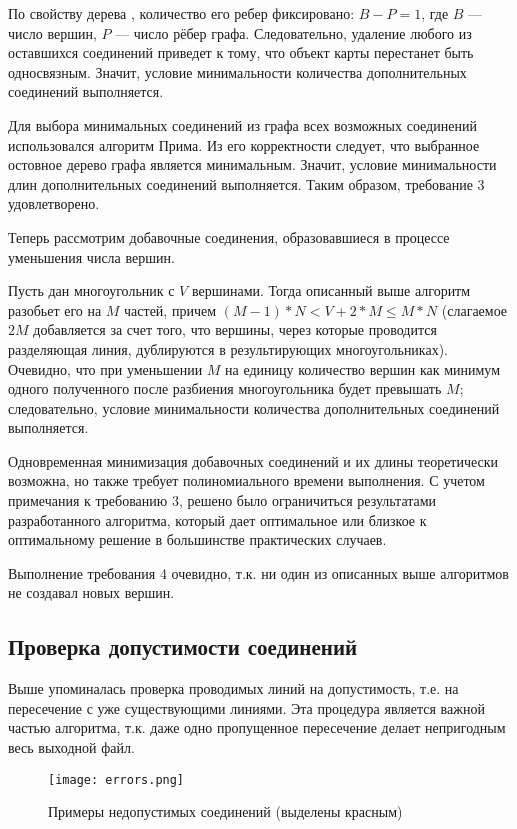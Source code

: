 По свойству дерева \cite{__2010}, количество его ребер фиксировано: $B-P=1$, где $B$ — число вершин, $P$ — число рёбер графа. Следовательно, удаление любого из оставшихся соединений приведет к тому, что объект карты перестанет быть односвязным. Значит, условие минимальности количества дополнительных соединений выполняется.

Для выбора минимальных соединений из графа всех возможных соединений использовался алгоритм Прима. Из его корректности \cite{prim_shortest_1957} следует, что выбранное остовное дерево графа является минимальным. Значит, условие минимальности длин дополнительных соединений выполняется. Таким образом, требование 3 удовлетворено.

Теперь рассмотрим добавочные соединения, образовавшиеся в процессе уменьшения числа вершин.

Пусть дан многоугольник с $V$ вершинами. Тогда описанный выше алгоритм разобьет его на $M$ частей, причем $(M-1)*N < V+2*M \leq M*N$ (слагаемое $2M$ добавляется за счет того, что вершины, через которые проводится разделяющая линия, дублируются в результирующих многоугольниках). Очевидно, что при уменьшении $M$ на единицу количество вершин как минимум одного полученного после разбиения многоугольника будет превышать $M$; следовательно, условие минимальности количества дополнительных соединений выполняется.

Одновременная минимизация добавочных соединений и их длины теоретически возможна, но также требует полиномиального времени выполнения. С учетом примечания к требованию 3, решено было ограничиться результатами разработанного алгоритма, который дает оптимальное или близкое к оптимальному решение в большинстве практических случаев.

Выполнение требования 4 очевидно, т.к. ни один из описанных выше алгоритмов не создавал новых вершин.

\subsection{Проверка допустимости соединений}
\label{}

Выше упоминалась проверка проводимых линий на допустимость, т.е. на пересечение с уже существующими линиями. Эта процедура является важной частью алгоритма, т.к. даже одно пропущенное пересечение делает непригодным весь выходной файл.

\begin{figure}[!htb]
    \centering
    \texttt{[image: errors.png]}
    \caption{Примеры недопустимых соединений (выделены красным)}
    \label{fig:errors}
\end{figure}

